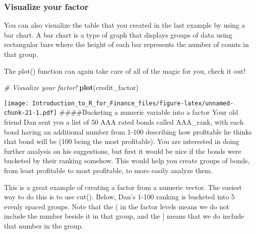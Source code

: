 \documentclass[]{article}
\newenvironment{Shaded}{\begin{snugshade}}{\end{snugshade}}
\newcommand{\KeywordTok}[1]{\textcolor[rgb]{0.13,0.29,0.53}{\textbf{#1}}}
\newcommand{\CommentTok}[1]{\textcolor[rgb]{0.56,0.35,0.01}{\textit{#1}}}
\newcommand{\NormalTok}[1]{#1}
\begin{document}
\subsubsection{Visualize your factor}\label{visualize-your-factor}

You can also visualize the table that you created in the last example by
using a bar chart. A bar chart is a type of graph that displays groups
of data using rectangular bars where the height of each bar represents
the number of counts in that group.

The plot() function can again take care of all of the magic for you,
check it out!

\begin{Shaded}
\begin{Highlighting}[]
\CommentTok{# Visualize your factor!}
\KeywordTok{plot}\NormalTok{(credit_factor)}
\end{Highlighting}
\end{Shaded}

\texttt{[image: Introduction\_to\_R\_for\_Finance\_files/figure-latex/unnamed-chunk-21-1.pdf]}
\#\#\#\#Bucketing a numeric variable into a factor Your old friend Dan
sent you a list of 50 AAA rated bonds called AAA\_rank, with each bond
having an additional number from 1-100 describing how profitable he
thinks that bond will be (100 being the most profitable). You are
interested in doing further analysis on his suggestions, but first it
would be nice if the bonds were bucketed by their ranking somehow. This
would help you create groups of bonds, from least profitable to most
profitable, to more easily analyze them.

This is a great example of creating a factor from a numeric vector. The
easiest way to do this is to use cut(). Below, Dan's 1-100 ranking is
bucketed into 5 evenly spaced groups. Note that the ( in the factor
levels means we do not include the number beside it in that group, and
the {]} means that we do include that number in the group.
\end{document}
